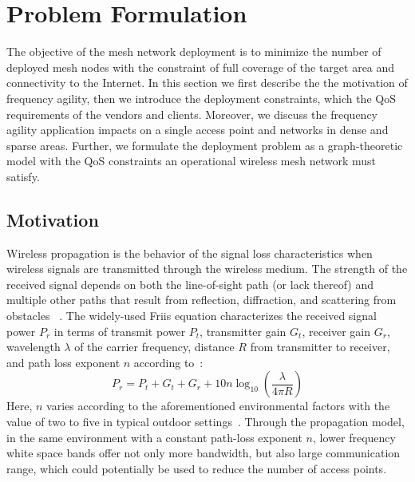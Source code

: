 \section{Problem Formulation}
\label{sec:problemformulation}



The objective of the mesh network deployment is to minimize the number of 
deployed mesh nodes with the constraint of full coverage of the target area 
and connectivity to the Internet. In this section we first describe the 
the motivation of frequency agility, then we introduce 
the deployment constraints, which the QoS requirements of the vendors and clients.
Moreover, we discuss the frequency agility application impacts 
on a single access point and networks in dense and sparse areas.
Further, we formulate the deployment problem as a graph-theoretic model
with the QoS constraints an operational wireless mesh network must satisfy. 

\subsection{Motivation}
\label{subsec:motivation}
Wireless propagation is the behavior of the signal loss characteristics 
when wireless signals are transmitted through the wireless medium.
The strength of the received signal depends on both the line-of-sight
path (or lack thereof) and multiple other paths that result from 
reflection, diffraction, and scattering from obstacles
~\cite{andersen1995propagation}. The widely-used Friis equation 
characterizes the received signal power $P_r$ in terms of transmit 
power $P_t$, transmitter gain $G_t$, receiver gain $G_r$, wavelength
$\lambda$ of the carrier frequency, distance $R$ from transmitter to 
receiver, and path loss exponent $n$ according to~\cite{friis}:
\begin{equation}
\label{eq:friis}
P_r=P_t+G_t+G_r+10n \log_{10}\left( \frac{\lambda}{4\pi R}\right)
\end{equation}
Here, $n$ varies according to the aforementioned environmental 
factors with the value of two to five in typical outdoor 
settings~\cite{rappaport}. Through the propagation model, in 
the same environment with a constant path-loss exponent $n$, 
lower frequency white space bands offer not only more bandwidth, 
but also large communication range, which could potentially be 
used to reduce the number of access points. 

